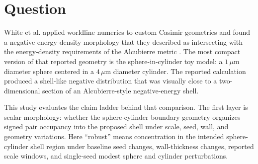 \documentclass[11pt]{article}
\newcommand{\um}{\,\mu\mathrm{m}}
\begin{document}
\begin{abstract}
The integrated result separates a positive morphology/source-placement result
from a closed direct-readout interpretation under the modeled laboratory
backgrounds. The selective scalar channel concentrates signed proxy magnitude
in the annular source region, places the radial maximum near the sphere-wall
gap, and keeps far-field leakage small. The tensor-scale proxy preserves this
shell placement and assigns a small fraction of the source proxy to the central
readout role. This supports the shell-morphology interpretation and clarifies
the readout path as a measurement role distinct from the main source channel.
SI calibration then fixes the magnitude layer: the shell-shaped source proxy
remains at Casimir gravitational strength, far beneath representative
warp-source demand and far beneath a recoverable timing/readout scale for the
modeled apparatus. The synthetic discrimination layer turns that scale result
into a laboratory gate. Geometry-coded perturbations can separate a shell
template from ordinary electromagnetic and material nuisance templates once a
shell-coded observable has already reached background-scale amplitude.
White's geometry therefore reads as a real shell-shaped Casimir boundary
morphology with useful source-placement structure; the current direct
laboratory detection interpretation closes under this audit class.
\end{abstract}

\section{Question}

White et al. applied worldline numerics to custom Casimir geometries and found
a negative energy-density morphology that they described as intersecting with
the energy-density requirements of the Alcubierre metric \cite{White2021}. The
most compact version of that reported geometry is the sphere-in-cylinder toy model: a
$1\um$ diameter sphere centered in a $4\um$ diameter cylinder. The reported
calculation produced a shell-like negative distribution that was visually close
to a two-dimensional section of an Alcubierre-style negative-energy shell.

This study evaluates the claim ladder behind that comparison. The first layer
is scalar morphology: whether the sphere-cylinder boundary geometry organizes
signed pair occupancy into the proposed shell under scale, seed, wall, and
geometry variations. Here ``robust'' means concentration in the intended
sphere-cylinder shell region under baseline seed changes, wall-thickness
changes, reported scale windows, and single-seed modest sphere and cylinder
perturbations.
\end{document}
